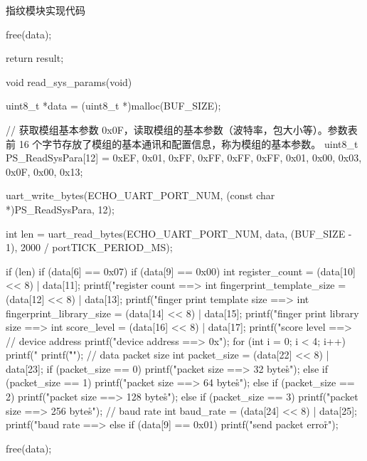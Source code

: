 \documentclass[lang=cn,newtx,10pt,scheme=chinese]{elegantbook}
\begin{document}
\begin{mycode}{指纹模块实现代码}
{    free(data);

    return result;
}

void read_sys_params(void)
{
    uint8_t *data = (uint8_t *)malloc(BUF_SIZE);

    // 获取模组基本参数 0x0F，读取模组的基本参数（波特率，包大小等）。参数表前 16 个字节存放了模组的基本通讯和配置信息，称为模组的基本参数。
    uint8_t PS_ReadSysPara[12] = {0xEF, 0x01, 0xFF, 0xFF, 0xFF, 0xFF, 0x01, 0x00, 0x03, 0x0F, 0x00, 0x13};

    uart_write_bytes(ECHO_UART_PORT_NUM, (const char *)PS_ReadSysPara, 12);

    int len = uart_read_bytes(ECHO_UART_PORT_NUM, data, (BUF_SIZE - 1), 2000 / portTICK_PERIOD_MS);

    if (len)
    {
        if (data[6] == 0x07)
        {
            if (data[9] == 0x00)
            {
                int register_count = (data[10] << 8) | data[11];
                printf("register count ==> %
                int fingerprint_template_size = (data[12] << 8) | data[13];
                printf("finger print template size ==> %
                int fingerprint_library_size = (data[14] << 8) | data[15];
                printf("finger print library size ==> %
                int score_level = (data[16] << 8) | data[17];
                printf("score level ==> %
                // device address
                printf("device address ==> 0x");
                for (int i = 0; i < 4; i++)
                {
                    printf("%
                }
                printf("\r\n");
                // data packet size
                int packet_size = (data[22] << 8) | data[23];
                if (packet_size == 0)
                {
                    printf("packet size ==> 32 bytes\r\n");
                }
                else if (packet_size == 1)
                {
                    printf("packet size ==> 64 bytes\r\n");
                }
                else if (packet_size == 2)
                {
                    printf("packet size ==> 128 bytes\r\n");
                }
                else if (packet_size == 3)
                {
                    printf("packet size ==> 256 bytes\r\n");
                }
                // baud rate
                int baud_rate = (data[24] << 8) | data[25];
                printf("baud rate ==> %
            }
            else if (data[9] == 0x01)
            {
                printf("send packet error\r\n");
            }
        }
    }

    free(data);
}
\end{mycode}
\end{document}
